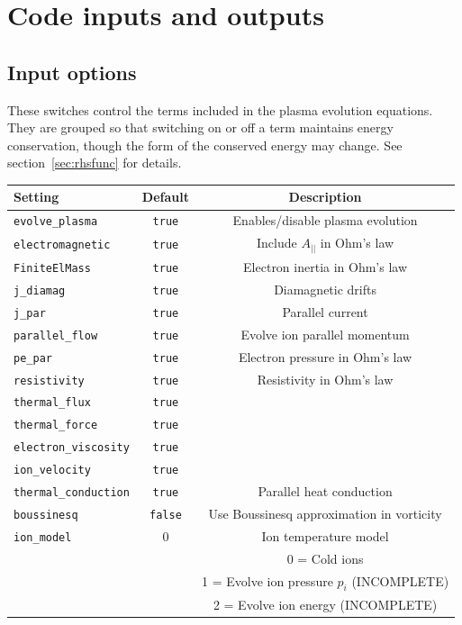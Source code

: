 \documentclass[12pt,a4paper]{article}
\begin{document}
\section{Code inputs and outputs}

\subsection{Input options}

These switches control the terms included in the plasma
evolution equations. They are grouped so that switching on
or off a term maintains energy conservation, though the
form of the conserved energy may change. See section~\ref{sec:rhsfunc} for details.
\begin{center}
\begin{tabular}{l c c}
  Setting & Default & Description \\
  \hline
  \texttt{evolve\_plasma}  & \texttt{true} & Enables/disable plasma evolution \\
  \texttt{electromagnetic}  &  \texttt{true} & Include $A_{||}$ in Ohm's law\\
  \texttt{FiniteElMass}  & \texttt{true} & Electron inertia in Ohm's law \\
  \texttt{j\_diamag} & \texttt{true} & Diamagnetic drifts \\
  \texttt{j\_par} & \texttt{true} & Parallel current \\
  \texttt{parallel\_flow} & \texttt{true} & Evolve ion parallel momentum \\
  \texttt{pe\_par} & \texttt{true} & Electron pressure in Ohm's law \\
  \texttt{resistivity} & \texttt{true} & Resistivity in Ohm's law \\
  \texttt{thermal\_flux} & \texttt{true} &  \\
  \texttt{thermal\_force} & \texttt{true} &  \\
  \texttt{electron\_viscosity} & \texttt{true} &  \\
  \texttt{ion\_velocity} & \texttt{true} &  \\
  \texttt{thermal\_conduction} & \texttt{true} & Parallel heat conduction \\
  \texttt{boussinesq} & \texttt{false} & Use Boussinesq approximation in vorticity \\
  \texttt{ion\_model} & $0$ & Ion temperature model \\
  & & 0 = Cold ions \\
  & & 1 = Evolve ion pressure $p_i$ (INCOMPLETE)\\
  & & 2 = Evolve ion energy (INCOMPLETE) \\
  \hline
\end{tabular}
\end{center}
\end{document}
